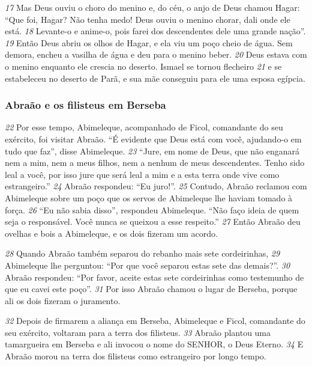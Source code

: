 \bigskip   
\textit{\tiny 17}
Mas Deus ouviu o choro do menino e, do céu, o anjo de Deus chamou Hagar:
“Que foi, Hagar? Não tenha medo! Deus ouviu o menino chorar, dali onde ele está.
\textit{\tiny 18}
Levante-o e anime-o, pois farei dos descendentes dele uma grande nação”.
\textit{\tiny 19}
Então Deus abriu os olhos de Hagar, e ela viu um poço cheio de água. Sem
demora, encheu a vasilha de água e deu para o menino beber.
\textit{\tiny 20}
Deus estava com o menino enquanto ele crescia no deserto. Ismael se tornou
flecheiro 
\textit{\tiny 21}
e se estabeleceu no deserto de Parã, e sua mãe conseguiu para ele uma
esposa egípcia.

\bigskip   
\subsubsection*{Abraão e os filisteus em Berseba}
\textit{\tiny 22}
Por esse tempo, Abimeleque, acompanhado de Ficol, comandante do seu
exército, foi visitar Abraão. “É evidente que Deus está com você, ajudando-o em
tudo que faz”, disse Abimeleque. 
\textit{\tiny 23}
“Jure, em nome de Deus, que não enganará
nem a mim, nem a meus filhos, nem a nenhum de meus descendentes. Tenho
sido leal a você, por isso jure que será leal a mim e a esta terra onde vive como
estrangeiro.”
\textit{\tiny 24}
Abraão respondeu: “Eu juro!”. 
\textit{\tiny 25}
Contudo, Abraão reclamou com Abimeleque
sobre um poço que os servos de Abimeleque lhe haviam tomado à força.
\textit{\tiny 26}
“Eu não sabia disso”, respondeu Abimeleque. “Não faço ideia de quem seja o
responsável. Você nunca se queixou a esse respeito.”
\textit{\tiny 27}
Então Abraão deu ovelhas e bois a Abimeleque, e os dois fizeram um acordo.

\bigskip   
\textit{\tiny 28}
Quando Abraão também separou do rebanho mais sete cordeirinhas,
\textit{\tiny 29}
Abimeleque lhe perguntou: “Por que você separou estas sete das demais?”.
\textit{\tiny 30}
Abraão respondeu: “Por favor, aceite estas sete cordeirinhas como
testemunho de que eu cavei este poço”. 
\textit{\tiny 31}
Por isso Abraão chamou o lugar de
Berseba, porque ali os dois fizeram o juramento.

\bigskip   
\textit{\tiny 32}
Depois de firmarem a aliança em Berseba, Abimeleque e Ficol, comandante
do seu exército, voltaram para a terra dos filisteus. 
\textit{\tiny 33}
Abraão plantou uma
tamargueira em Berseba e ali invocou o nome do SENHOR, o Deus Eterno.
\textit{\tiny 34}
E
Abraão morou na terra dos filisteus como estrangeiro por longo tempo.

